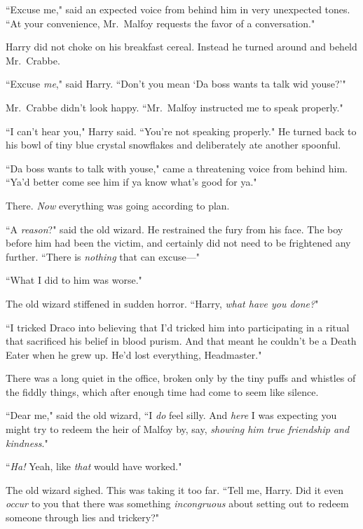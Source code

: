 ``Excuse me," said an expected voice from behind him in very unexpected tones. ``At your convenience, Mr.~Malfoy requests the favor of a conversation."

Harry did not choke on his breakfast cereal. Instead he turned around and beheld Mr.~Crabbe.

``Excuse \emph{me}," said Harry. ``Don't you mean `Da boss wants ta talk wid youse?'"

Mr.~Crabbe didn't look happy. ``Mr.~Malfoy instructed me to speak properly."

``I can't hear you," Harry said. ``You're not speaking properly." He turned back to his bowl of tiny blue crystal snowflakes and deliberately ate another spoonful.

``Da boss wants to talk with youse," came a threatening voice from behind him. ``Ya'd better come see him if ya know what's good for ya."

There. \emph{Now} everything was going according to plan.


``A \emph{reason}?" said the old wizard. He restrained the fury from his face. The boy before him had been the victim, and certainly did not need to be frightened any further. ``There is \emph{nothing} that can excuse—"

``What I did to him was worse."

The old wizard stiffened in sudden horror. ``Harry, \emph{what have you done?}"

``I tricked Draco into believing that I'd tricked him into participating in a ritual that sacrificed his belief in blood purism. And that meant he couldn't be a Death Eater when he grew up. He'd lost everything, Headmaster."

There was a long quiet in the office, broken only by the tiny puffs and whistles of the fiddly things, which after enough time had come to seem like silence.

``Dear me," said the old wizard, ``I \emph{do} feel silly. And \emph{here} I was expecting you might try to redeem the heir of Malfoy by, say, \emph{showing him true friendship and kindness}."

``\emph{Ha!} Yeah, like \emph{that} would have worked."

The old wizard sighed. This was taking it too far. ``Tell me, Harry. Did it even \emph{occur} to you that there was something \emph{incongruous} about setting out to redeem someone through lies and trickery?"

